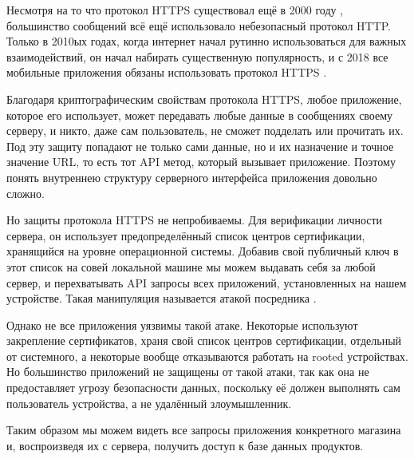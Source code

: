 \documentclass[a4paper,12pt]{article}
\begin{document}
  Несмотря на то что протокол HTTPS существовал ещё в 2000 году \cite{https_rfc},
  большинство сообщений всё ещё использовало небезопасный протокол HTTP.
  Только в 2010ых годах, когда интернет начал рутинно использоваться для важных взаимодействий,
  он начал набирать существенную популярность, и с 2018 все мобильные приложения обязаны использовать протокол HTTPS \cite{android2018}.

  Благодаря криптографическим свойствам протокола HTTPS, любое приложение, которое его использует,
  может передавать любые данные в сообщениях своему серверу,
  и никто, даже сам пользователь, не сможет подделать или прочитать их.
  Под эту защиту попадают не только сами данные, но и их назначение и точное значение URL,
  то есть тот API метод, который вызывает приложение.
  Поэтому понять внутреннею структуру серверного интерфейса приложения довольно сложно.

  Но защиты протокола HTTPS не непробиваемы.
  Для верификации личности сервера, он использует предопределённый список центров сертификации, хранящийся на уровне операционной системы.
  Добавив свой публичный ключ в этот список на совей локальной машине мы можем выдавать себя за любой сервер,
  и перехватывать API запросы всех приложений, установленных на нашем устройстве.
  Такая манипуляция называется атакой посредника \cite{middleman}.

  Однако не все приложения уязвимы такой атаке.
  Некоторые используют закрепление сертификатов, храня свой список центров сертификации, отдельный от системного,
  а некоторые вообще отказываются работать на rooted устройствах.
  Но большинство приложений не защищены от такой атаки, так как она не предоставляет угрозу безопасности данных,
  поскольку её должен выполнять сам пользователь устройства, а не удалённый злоумышленник.

  Таким образом мы можем видеть все запросы приложения конкретного магазина и, воспроизведя их с сервера,
  получить доступ к базе данных продуктов.
\end{document}
